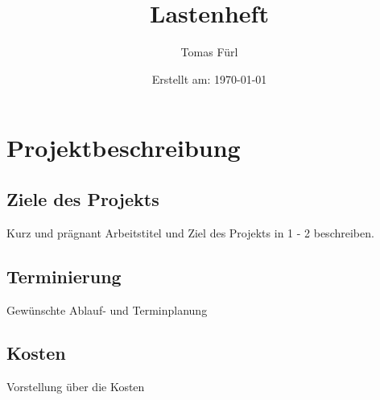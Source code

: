 \documentclass[a4paper, 12pt]{article}
\title{Lastenheft \Projektname}
\date{Erstellt am: \today}
\author{Tomas Fürl}
\begin{document}
    \maketitle
    \newpage
    \section{Projektbeschreibung}
    \subsection{Ziele des Projekts}
    Kurz und prägnant Arbeitstitel und Ziel des Projekts in 1 - 2 beschreiben.
    \subsection{Terminierung}
    Gewünschte Ablauf- und Terminplanung
    \subsection{Kosten}
    Vorstellung über die Kosten
\end{document}
